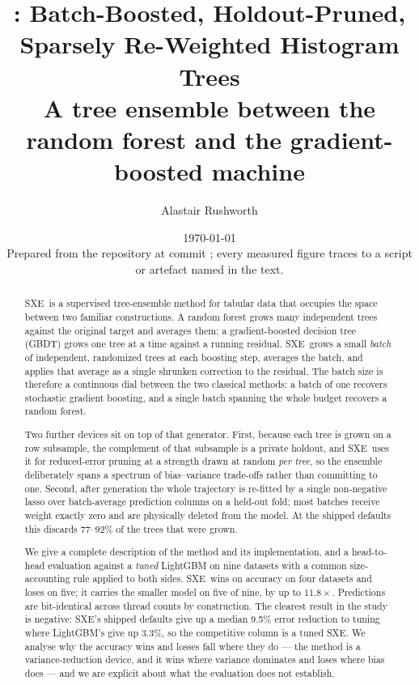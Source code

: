 \documentclass[11pt,a4paper]{article}
\title{\Large \SXE: Batch-Boosted, Holdout-Pruned, Sparsely Re-Weighted
Histogram Trees\\[0.4em]
\large A tree ensemble between the random forest and the gradient-boosted machine}
\author{Alastair Rushworth}
\date{%
  \today\\[0.5em]
  \small Prepared from the \code{sxe} repository at commit \code{eb97f58};
  every measured figure traces to a script or artefact named in the text.
}
\newcommand{\SXE}{\textsc{SXE}}
\theoremstyle{definition}
\begin{document}
\maketitle

\begin{abstract}
\noindent
\SXE\ is a supervised tree-ensemble method for tabular data that occupies the
space between two familiar constructions. A random forest grows many
independent trees against the original target and averages them; a
gradient-boosted decision tree (GBDT) grows one tree at a time against a
running residual. \SXE\ grows a small \emph{batch} of independent, randomized
trees at each boosting step, averages the batch, and applies that average as a
single shrunken correction to the residual. The batch size is therefore a
continuous dial between the two classical methods: a batch of one recovers
stochastic gradient boosting, and a single batch spanning the whole budget
recovers a random forest.

Two further devices sit on top of that generator. First, because each tree is
grown on a row subsample, the complement of that subsample is a private
holdout, and \SXE\ uses it for reduced-error pruning at a strength drawn at
random \emph{per tree}, so the ensemble deliberately spans a spectrum of
bias--variance trade-offs rather than committing to one. Second, after
generation the whole trajectory is re-fitted by a single non-negative lasso
over batch-average prediction columns on a held-out fold; most batches receive
weight exactly zero and are physically deleted from the model. At the shipped
defaults this discards 77--92\% of the trees that were grown.

We give a complete description of the method and its implementation, and a
head-to-head evaluation against a \emph{tuned} LightGBM on nine datasets with a
common size-accounting rule applied to both sides. \SXE\ wins on accuracy on
four datasets and loses on five; it carries the smaller model on five of nine,
by up to $11.8\times$. Predictions are bit-identical across thread counts by
construction. The clearest result in the study is negative: \SXE's shipped
defaults give up a median 9.5\% error reduction to tuning where LightGBM's give
up 3.3\%, so the competitive column is a tuned \SXE. We analyse why the
accuracy wins and losses fall where they do --- the method is a
variance-reduction device, and it wins where variance dominates and loses where
bias does --- and we are explicit about what the evaluation does not establish.
\end{abstract}
\end{document}
